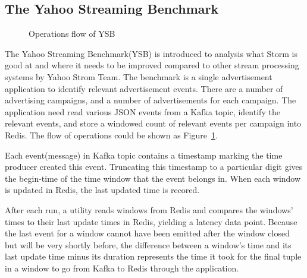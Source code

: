 \subsection{The Yahoo Streaming Benchmark}
\begin{figure}
  \begin{center}
   \caption{Operations flow of YSB \cite{YSB}}
   \label{fig:yahoo_stream_bench}
  \end{center}
\end{figure}


The Yahoo Streaming Benchmark(YSB) is introduced to analysis what Storm is good at and where it needs to be improved compared to other stream processing systems by Yahoo Strom Team. \cite{YSB} The benchmark is a single advertisement application to identify relevant advertisement events. There are a number of advertising campaigns, and a number of advertisements for each campaign. The application need read various JSON events from a Kafka topic, identify the relevant events, and store a windowed count of relevant events per campaign into Redis. The flow of operations could be shown as Figure~\ref{fig:yahoo_stream_bench}.

Each event(message) in Kafka topic contains a timestamp marking the time producer created this event. Truncating this timestamp to a particular digit gives the begin-time of the time window that the event belongs in. When each window is updated in Redis, the last updated time is recored.

After each run, a utility reads windows from Redis and compares the windows' times to their last update times in Redis, yielding a latency data point. Because the last event for a window cannot have been emitted after the window closed but will be very shortly before, the difference between a window's time and its last update time minus its duration represents the time it took for the final tuple in a window to go from Kafka to Redis through the application. \\

